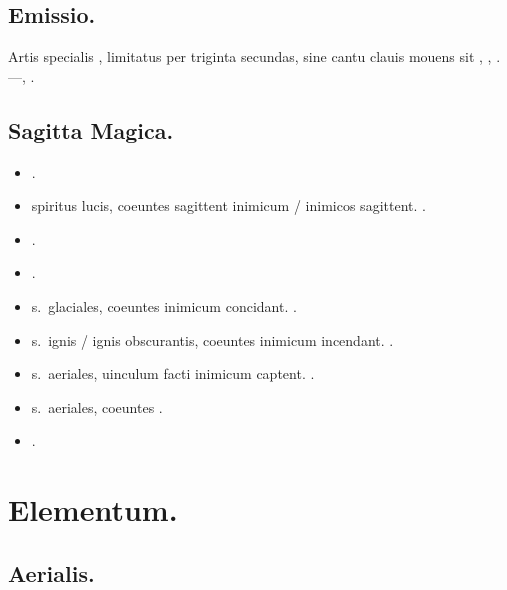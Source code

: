 \documentclass[12pt]{book}
\begin{document}
\subsection{Emissio.}\label{emissio}

Artis specialis , limitatus per triginta secundas,
sine cantu clauis mouens sit , ,
.
---, .

\subsection{Sagitta Magica.}\label{sagitta-magica}

\begin{itemize}
  \item {}.
  \item {} spiritus lucis, coeuntes sagittent inimicum / inimicos sagittent. .
  \item \textelp{} .
  \item \textelp{} .
  \item {} s.~glaciales, coeuntes inimicum concidant. .
  \item {} s.~ignis / ignis obscurantis, coeuntes inimicum incendant. .
  \item {} s.~aeriales, uinculum facti inimicum captent. .
  \item {} s.~aeriales, coeuntes \textelp{} .
  \item \textelp{} .
\end{itemize}

\section{Elementum.}\label{elementum}
\subsection{Aerialis.}\label{aerialis}
\end{document}
